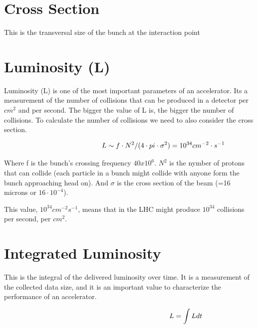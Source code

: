 \;
\;


\section{Cross Section}


\noindent
This is the transversal size of the bunch at the interaction point

\;
\;

\section{Luminosity (L)}


\noindent
Luminosity (L) is one of the most important parameters of an accelerator. Its a measurement of the number of collisions that can be produced in a detector per $cm^{2}$ and per second. The bigger the value of L is, the bigger the number of collisions. To calculate the number of collisions we need to also consider the cross section.

\begin{equation}\hspace{34 mm}L\sim f\cdot N^{2}/(4\cdot pi\cdot  \sigma ^{2}) = 10^{34} cm^{-2} \cdot s^{-1} \end{equation}

\;
\;

\noindent
Where f is the bunch's crossing frequency $40x10^{6}$. $N^{2}$ is the nymber of protons that can collide (each particle in a bunch might collide with anyone form the bunch approaching head on). And $\sigma$ is the cross section of the beam (=16 microns or $16\cdot 10^{-4}$).

\;
\;
\noindent
This value, $10^{34}cm^{-2}s^{-1}$, means that in the LHC might produce $10^{34}$ collisions per second, per $cm^{2}$. 

\;
\;

\section{Integrated Luminosity}

\noindent
This is the integral of the delivered luminosity over time. It is a measurement of the collected data size, and it is an important value to characterize the performance of an accelerator.

\begin{equation}\hspace{57 mm}L = \int L dt \end{equation}

